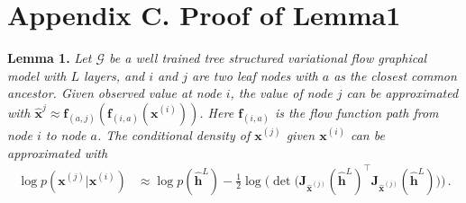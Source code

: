 \documentclass{article} %
\begin{document}
\section*{Appendix C.  Proof of Lemma1}\label{appd:proof}
\textbf{Lemma 1.} {\it Let $\mathcal{G}$ be a well trained tree structured variational flow graphical model with $L$ layers, and $i$ and $j$ are two leaf nodes with $a$ as the closest common ancestor. Given observed value at node $i$, the value of node $j$ can be approximated with   $\widehat{\mathbf{x}}^{j} \approx  \mathbf{f}_{(a,j)}(\mathbf{f}_{(i, a)}(\mathbf{x}^{(i)}))$. Here $\mathbf{f}_{(i, a)}$ is the flow function path from node $i$ to node $a$. The conditional density of $\mathbf{x}^{(j)}$ given $\mathbf{x}^{(i)}$ can be approximated with 
\begin{align*} %
\log p(\mathbf{x}^{(j)} | \mathbf{x}^{(i)}) &\approx  \log p(\widehat{\mathbf{h}}^L) -  \frac{1}{2} \log \big(\det \big(\mathbf{J}_{\widehat{\mathbf{x}}^{(j)}}(\widehat{\mathbf{h}}^L)^\top\mathbf{J}_{\widehat{\mathbf{x}}^{(j)}}(\widehat{\mathbf{h}}^L)\big) \big) \, .
\end{align*}
}
\end{document}
